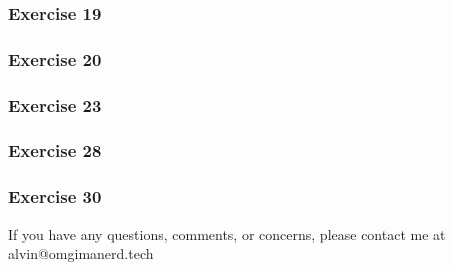 \documentclass{math}
\begin{document}
\subsubsection*{Exercise 19}
\subsubsection*{Exercise 20}
\subsubsection*{Exercise 23}
\subsubsection*{Exercise 28}
\subsubsection*{Exercise 30}

\begin{center}
  If you have any questions, comments, or concerns, please contact me at
  alvin@omgimanerd.tech
\end{center}
\end{document}

